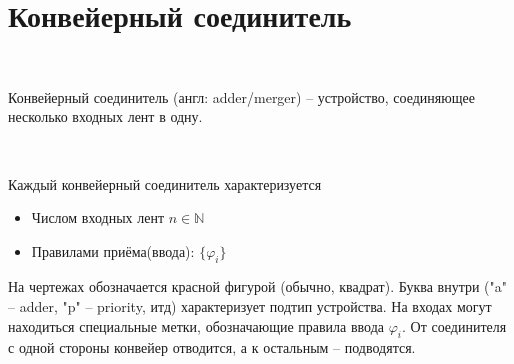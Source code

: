 \vspace{0.5in}

\section{Конвейерный соединитель}

\

Конвейерный соединитель (англ: adder/merger) -- устройство, соединяющее несколько входных лент в одну.

\

\noindent Каждый конвейерный соединитель характеризуется

\begin{itemize}
	\item Числом входных лент $n \in \mathbb{N}$
	
	\item Правилами приёма(ввода): $\{ \varphi_i \}$
\end{itemize}


\vspace{0.15in}

На чертежах обозначается красной фигурой (обычно, квадрат). Буква внутри ("a" -- adder, "p" -- priority, итд) характеризует подтип устройства. На входах могут находиться специальные метки, обозначающие правила ввода $\varphi_i$. От соединителя с одной стороны конвейер отводится, а к остальным -- подводятся.


\vspace{0.5in}


